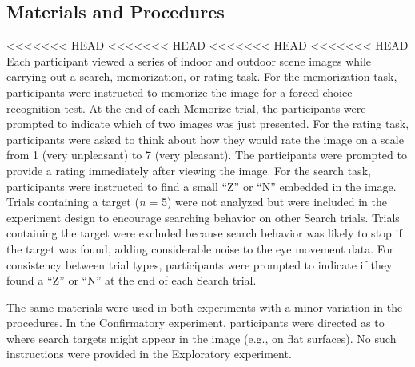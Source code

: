 \documentclass[
  english,
  man, donotrepeattitle,floatsintext]{apa6}
\begin{document}
\subsection{Materials and Procedures}

<<<<<<< HEAD
<<<<<<< HEAD
<<<<<<< HEAD
<<<<<<< HEAD
Each participant viewed a series of indoor and outdoor scene images while carrying out a search, memorization, or rating task. For the memorization task, participants were instructed to memorize the image for a forced choice recognition test. At the end of each Memorize trial, the participants were prompted to indicate which of two images was just presented. For the rating task, participants were asked to think about how they would rate the image on a scale from 1 (very unpleasant) to 7 (very pleasant). The participants were prompted to provide a rating immediately after viewing the image. For the search task, participants were instructed to find a small \enquote{Z} or \enquote{N} embedded in the image. Trials containing a target (\emph{n} = 5) were not analyzed but were included in the experiment design to encourage searching behavior on other Search trials. Trials containing the target were excluded because search behavior was likely to stop if the target was found, adding considerable noise to the eye movement data. For consistency between trial types, participants were prompted to indicate if they found a \enquote{Z} or \enquote{N} at the end of each Search trial.

The same materials were used in both experiments with a minor variation in the procedures. In the Confirmatory experiment, participants were directed as to where search targets might appear in the image (e.g., on flat surfaces). No such instructions were provided in the Exploratory experiment.
\end{document}
